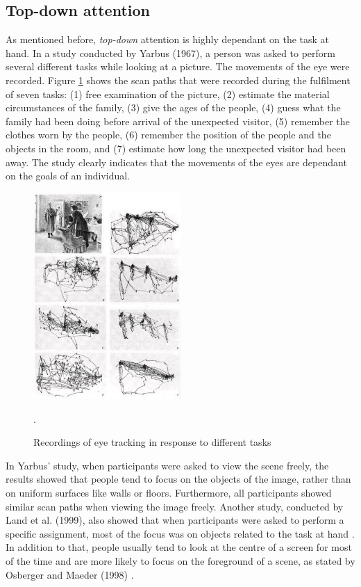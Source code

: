 \subsection{Top-down attention}\label{subsec:topdown_attention}
As mentioned before, \textit{top-down} attention is highly dependant on the task at hand. In a study conducted by Yarbus (1967), a person was asked to perform several different tasks while looking at a picture. The movements of the eye were recorded. Figure \ref{fig:eye_movement_recording} shows the scan paths that were recorded during the fulfilment of seven tasks: (1) free examination of the picture, (2) estimate the material circumstances of the family, (3) give the ages of the people, (4) guess what the family had been doing before arrival of the unexpected visitor, (5) remember the clothes worn by the people, (6) remember the position of the people and the objects in the room, and (7) estimate how long the unexpected visitor had been away. The study clearly indicates that the movements of the eyes are dependant on the goals of an individual. \cite{Yarbus1967}

\begin{figure}[h!]
	\centering
	\includegraphics[width=0.5\textwidth]{figures/eye_movement_recording.jpg}
	\caption{Recordings of eye tracking in response to different tasks \cite{sundstedt2012gazing}}.\label{fig:eye_movement_recording}
\end{figure}

In Yarbus' study, when participants were asked to view the scene freely, the results showed that people tend to focus on the objects of the image, rather than on uniform surfaces like walls or floors. Furthermore, all participants showed similar scan paths when viewing the image freely. Another study, conducted by Land et al. (1999), also showed that when participants were asked to perform a specific assignment, most of the focus was on objects related to the task at hand \cite{Land1999}.
In addition to that, people usually tend to look at the centre of a screen for most of the time and are more likely to focus on the foreground of a scene, as stated by Osberger and Maeder (1998) \cite{osberger1998automatic}.

